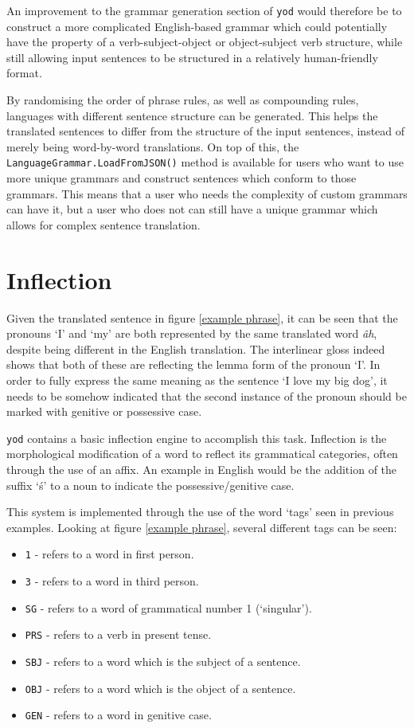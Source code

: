 \documentclass{report}
\begin{document}
	An improvement to the grammar generation section of \texttt{yod} would therefore be to construct a more complicated English-based grammar which could potentially have the property of a verb-subject-object or object-subject verb structure, while still allowing input sentences to be structured in a relatively human-friendly format.
	
	By randomising the order of phrase rules, as well as compounding rules, languages with different sentence structure can be generated. This helps the translated sentences to differ from the structure of the input sentences, instead of merely being word-by-word translations. On top of this, the \texttt{LanguageGrammar.\-LoadFromJSON()} method is available for users who want to use more unique grammars and construct sentences which conform to those grammars. This means that a user who needs the complexity of custom grammars can have it, but a user who does not can still have a unique grammar which allows for complex sentence translation.
	
	\section{Inflection}
	\label{section: inflection}
	
	Given the translated sentence in figure \ref{example phrase}, it can be seen that the pronouns `I' and `my' are both represented by the same translated word \textit{\dj{}\^{a}h}, despite being different in the English translation. The interlinear gloss indeed shows that both of these are reflecting the lemma form of the pronoun `I'. In order to fully express the same meaning as the sentence `I love my big dog', it needs to be somehow indicated that the second instance of the pronoun should be marked with genitive or possessive case.
	
	\texttt{yod} contains a basic inflection engine to accomplish this task. Inflection is the morphological modification of a word to reflect its grammatical categories\cite{crystal2011dictionary}, often through the use of an affix. An example in English would be the addition of the suffix `\'s' to a noun to indicate the possessive/genitive case.
	
	This system is implemented through the use of the word `tags' seen in previous examples. Looking at figure \ref{example phrase}, several different tags can be seen:
	\begin{itemize}
		\item \texttt{1} - refers to a word in first person.
		\item \texttt{3} - refers to a word in third person.
		\item \texttt{SG} - refers to a word of grammatical number 1 (`singular').
		\item \texttt{PRS} - refers to a verb in present tense.
		\item \texttt{SBJ} - refers to a word which is the subject of a sentence.
		\item \texttt{OBJ} - refers to a word which is the object of a sentence.
		\item \texttt{GEN} - refers to a word in genitive case.
	\end{itemize}
\end{document}
